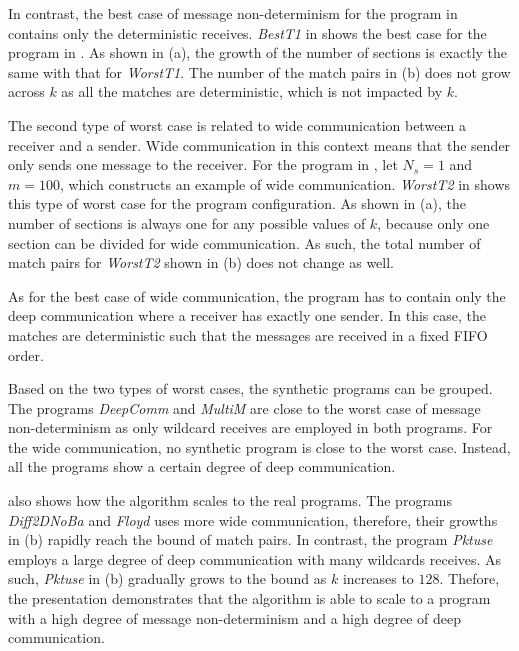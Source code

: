 In contrast, the best case of message non-determinism for the program in  contains only the deterministic receives. 
\textit{BestT1} in  shows the best case for the program in . As shown in  (a), the growth of the number of sections is exactly the same with that for \textit{WorstT1}. The number of the match pairs in  (b) does not grow across $k$ as all the matches are deterministic, which is not impacted by $k$. 

The second type of worst case is related to wide communication between a receiver and a sender. 
Wide communication in this context means that the sender only sends one message to the receiver. For the program in , let $N_s=1$ and $m=100$, which constructs an example of wide communication. 
\textit{WorstT2} in  shows this type of worst case for the program configuration. 
As shown in  (a), the number of sections is always one for any possible values of $k$, because only one section can be divided for wide communication. 
As such, the total number of match pairs for \textit{WorstT2} shown in  (b) does not change as well. 

As for the best case of wide communication, the program has to contain only the deep communication where a receiver has exactly one sender. In this case, the matches are deterministic such that the messages are received in a fixed FIFO order.

Based on the two types of worst cases, the synthetic programs can be grouped. The programs \textit{DeepComm} and \textit{MultiM} are close to the worst case of message non-determinism as only wildcard receives are employed in both programs. For the wide communication, no synthetic program is close to the worst case. Instead, all the programs show a certain degree of deep communication. 

 also shows how the algorithm scales to the real programs. 
The programs \textit{Diff2DNoBa} and \textit{Floyd} uses more wide communication, therefore, their growths in  (b) rapidly reach the bound of match pairs. In contrast, the program \textit{Pktuse} employs a large degree of deep communication with many wildcards receives. As such, \textit{Pktuse} in  (b) gradually grows to the bound as $k$ increases to $128$.
Thefore, the presentation demonstrates that the algorithm is able to scale to a program with a high degree of message non-determinism and a high degree of deep communication.
